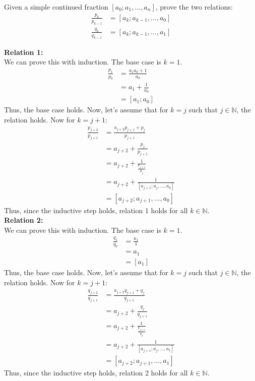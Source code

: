 \documentclass{article}
\begin{document}
\begin{problem}{}{}
    \color{CtpText}
    Given a simple continued fraction $[a_0;a_1,\dots,a_n]$, prove the two relations:
    \begin{align}
        \frac{p_k}{p_{k-1}} &= [a_k;a_{k-1},\dots,a_0] \\
        \frac{q_k}{q_{k-1}} &= [a_k;a_{k-1},\dots,a_1]
    \end{align}
\end{problem}
\begin{solution}{}{}
    \color{CtpText}
    \textbf{Relation 1:}\\
    We can prove this with induction. The base case is $k=1$.
    \begin{align*}
        \frac{p_1}{p_0} &= \frac{a_1a_0 + 1}{a_0} \\
        &= a_1 + \frac{1}{a_0} \\
        &= [a_1;a_0]
    \end{align*}
    Thus, the base case holds. Now, let's assume that for $k=j$ such that $j\in\mathbb{N}$, the relation holds. Now for $k=j+1$:
    \begin{align*}
        \frac{p_{j+2}}{p_{j+1}} &= \frac{a_{j+2}p_{j+1} + p_j}{p_{j+1}} \\
        &= a_{j+2} + \frac{p_j}{p_{j+1}} \\
        &= a_{j+2} + \frac{1}{\frac{p_{j+1}}{p_j}} \\
        &= a_{j+2} + \frac{1}{[a_{j+1};a_j,\dots,a_0]} \\
        &= [a_{j+2};a_{j+1},\dots,a_0]
    \end{align*}
    Thus, since the inductive step holds, relation 1 holds for all $k\in\mathbb{N}$. \\
    \textbf{Relation 2:}\\
    We can prove this with induction. The base case is $k=1$.
    \begin{align*}
        \frac{q_1}{q_0} &= \frac{a_1}{1} \\
        &= a_1 \\
        &= [a_1]
    \end{align*}
    Thus, the base case holds. Now, let's assume that for $k=j$ such that $j\in\mathbb{N}$, the relation holds. Now for $k=j+1$:
    \begin{align*}
        \frac{q_{j+2}}{q_{j+1}} &= \frac{a_{j+2}q_{j+1} + q_j}{q_{j+1}} \\
        &= a_{j+2} + \frac{q_j}{q_{j+1}} \\
        &= a_{j+2} + \frac{1}{\frac{q_{j+1}}{q_j}} \\
        &= a_{j+2} + \frac{1}{[a_{j+1};a_j,\dots,a_1]} \\
        &= [a_{j+2};a_{j+1},\dots,a_1]
    \end{align*}
    Thus, since the inductive step holds, relation 2 holds for all $k\in\mathbb{N}$.
\end{solution}
\end{document}
